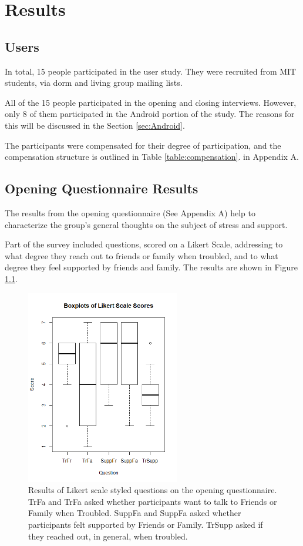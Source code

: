 \chapter{Results}
\section{Users}
  In total, 15 people participated in the user study.
  They were recruited from MIT students,
  via dorm and living group mailing lists.

  All of the 15 people participated in the opening and closing interviews.
  However, only 8 of them participated in the Android portion of the study.
  The reasons for this will be discussed in the Section \ref{sec:Android}.

  The participants were compensated for their degree of participation,
  and the compensation structure is outlined in Table \ref{table:compensation}.
  in Appendix A.

\section{Opening Questionnaire Results}
  The results from the opening questionnaire (See Appendix A)
  help to characterize the group's
  general thoughts on the subject of stress and support.
  
  Part of the survey included questions, scored on a Likert Scale,
  addressing to what degree they reach out to friends or family when troubled,
  and to what degree they feel supported by friends and family.
  The results are shown in Figure \ref{fig:likert}.

    \begin{figure}
    \centering
    \includegraphics[width=0.6\textwidth]{likert.png}
    \caption[Likert Scale Box Plots]{
      Results of Likert scale styled questions on the opening questionnaire.
      TrFa and TrFa asked whether participants want to talk to
      Friends or Family when Troubled.
      SuppFa and SuppFa asked whether participants felt supported by
      Friends or Family.
      TrSupp asked if they reached out, in general, when troubled.
    }
    \label{fig:likert}
    \end{figure}

